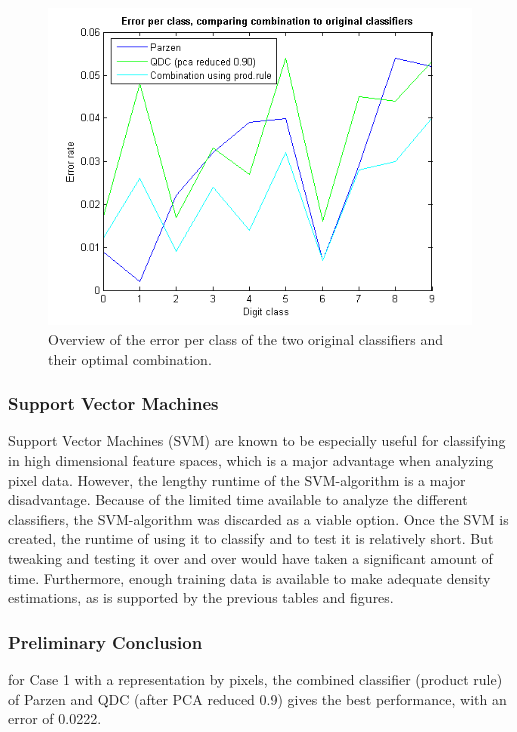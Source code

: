 \begin{figure}[H]
	\centering
	\includegraphics[scale=0.8]{images/pr_figure_4.png}
	\caption{Overview of the error per class of the two original classifiers and their optimal combination.}
	\label{fig:errorpdigit3}
\end{figure}
\subsubsection*{Support Vector Machines}
Support Vector Machines (SVM) are known to be especially useful for classifying in high dimensional feature spaces, which is a major advantage when analyzing pixel data. However, the lengthy runtime of the SVM-algorithm is a major disadvantage. Because of the limited time available to analyze the different classifiers, the SVM-algorithm was discarded as a viable option. Once the SVM is created, the runtime of using it to classify and to test it is relatively short. But tweaking and testing it over and over would have taken a significant amount of time. Furthermore, enough training data is available to make adequate density estimations, as is supported by the previous tables and figures.

\subsubsection*{Preliminary Conclusion} for Case 1 with a representation by pixels, the combined classifier (product rule) of Parzen and QDC (after PCA reduced 0.9) gives the best performance, with an error of 0.0222.

